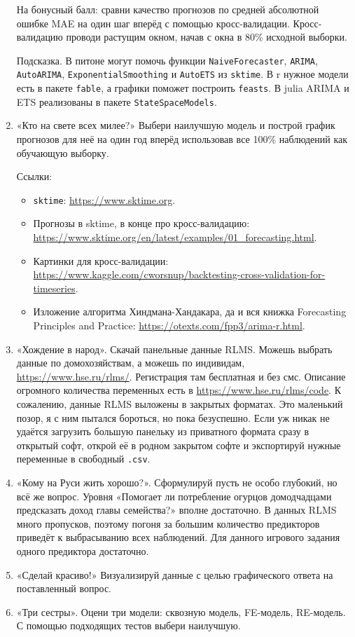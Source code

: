 \documentclass[12pt]{article}
\begin{document}
\begin{enumerate}
    На бонусный балл: сравни качество прогнозов по средней абсолютной ошибке MAE на один шаг вперёд с помощью кросс-валидации. 
    Кросс-валидацию проводи растущим окном, начав с окна в 80\% исходной выборки. 

    Подсказка. В питоне могут помочь функции \verb|NaiveForecaster|, \verb|ARIMA|, \verb|AutoARIMA|, \verb|ExponentialSmoothing| и \verb|AutoETS| из \verb|sktime|.
    В r нужное модели есть в пакете \verb|fable|, а графики поможет построить \verb|feasts|. В julia ARIMA и ETS реализованы в пакете \verb|StateSpaceModels|.

    \item «Кто на свете всех милее?» 
    Выбери наилучшую модель и построй график прогнозов для неё на один год вперёд использовав все 100\% наблюдений как обучающую выборку. 


    Ссылки: 
    \begin{itemize}
        \item \verb|sktime|: \url{https://www.sktime.org}.
        \item Прогнозы в sktime, в конце про кросс-валидацию: \url{https://www.sktime.org/en/latest/examples/01_forecasting.html}.
        \item Картинки для кросс-валидации: \url{https://www.kaggle.com/cworsnup/backtesting-cross-validation-for-timeseries}.
        \item Изложение алгоритма Хиндмана-Хандакара, да и вся книжка Forecasting Principles and Practice: \url{https://otexts.com/fpp3/arima-r.html}.
    \end{itemize}

    

    \newpage
    \item «Хождение в народ». Скачай панельные данные RLMS. Можешь выбрать данные по домохозяйствам, а можешь по индивидам, \url{https://www.hse.ru/rlms/}. 
    Регистрация там бесплатная и без смс. Описание огромного количества переменных есть в \url{https://www.hse.ru/rlms/code}.
    К сожалению, данные RLMS выложены в закрытых форматах. Это маленький позор, я с ним пытался бороться, но пока безуспешно.  
    Если уж никак не удаётся загрузить большую панельку из приватного формата сразу в открытый софт, 
    открой её в родном закрытом софте и экспортируй нужные переменные в свободный \verb|.csv|.
    \item «Кому на Руси жить хорошо?». Сформулируй пусть не особо глубокий, но всё же вопрос. 
    Уровня «Помогает ли потребление огурцов домодчадцами предсказать доход главы семейства?» вполне достаточно. 
    В данных RLMS много пропусков, поэтому погоня за большим количество предикторов приведёт к выбрасыванию всех наблюдений.
    Для данного игрового задания одного предиктора достаточно. 
    \item «Сделай красиво!» Визуализируй данные с целью графического ответа на поставленный вопрос. 
    \item «Три сестры». Оцени три модели: сквозную модель, FE-модель, RE-модель. С помощью подходящих тестов выбери наилучшую. 
    

\end{enumerate}
\end{document}

